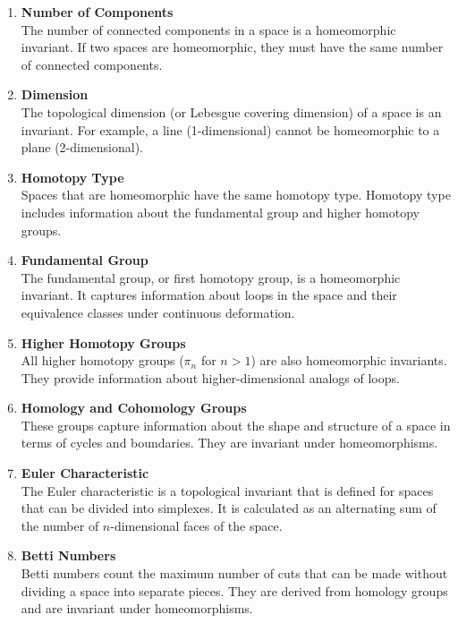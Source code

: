 \documentclass[a4paper]{article}
\begin{document}
\begin{enumerate}
    \item \textbf{Number of Components} \\
    The number of connected components in a space is a homeomorphic invariant. If two spaces are homeomorphic, they must have the same number of connected components.
    
    \item \textbf{Dimension} \\
    The topological dimension (or Lebesgue covering dimension) of a space is an invariant. For example, a line (1-dimensional) cannot be homeomorphic to a plane (2-dimensional).
    
    \item \textbf{Homotopy Type} \\
    Spaces that are homeomorphic have the same homotopy type. Homotopy type includes information about the fundamental group and higher homotopy groups.
    
    \item \textbf{Fundamental Group} \\
    The fundamental group, or first homotopy group, is a homeomorphic invariant. It captures information about loops in the space and their equivalence classes under continuous deformation.
    
    \item \textbf{Higher Homotopy Groups} \\
    All higher homotopy groups ($\pi_n$ for $n > 1$) are also homeomorphic invariants. They provide information about higher-dimensional analogs of loops.
    
    \item \textbf{Homology and Cohomology Groups} \\
    These groups capture information about the shape and structure of a space in terms of cycles and boundaries. They are invariant under homeomorphisms.
    
    \item \textbf{Euler Characteristic} \\
    The Euler characteristic is a topological invariant that is defined for spaces that can be divided into simplexes. It is calculated as an alternating sum of the number of $n$-dimensional faces of the space.
    
    \item \textbf{Betti Numbers} \\
    Betti numbers count the maximum number of cuts that can be made without dividing a space into separate pieces. They are derived from homology groups and are invariant under homeomorphisms.
\end{enumerate}
\end{document}
